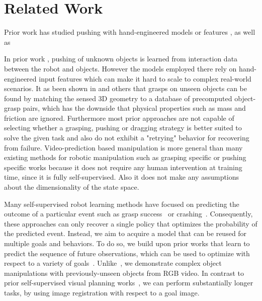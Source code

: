 \vspace{-0.1cm}
\section{Related Work}
\vspace{-0.1cm}

Prior work has studied pushing with hand-engineered models or features \cite{hermans2013learning,salganicoff1993vision}, as well as 

In prior work \cite{hermans2013learning,salganicoff1993vision}, pushing of unknown objects is learned from interaction data between the robot and objects. However the models employed there rely on hand-engineered input features which can make it hard to scale to complex real-world scenarios. 
It as been shown in \cite{goldfeder2009data} and others that grasps on unseen objects can be found by matching the sensed 3D geometry to a database of precomputed object-grasp pairs, which has the downside that physical properties such as mass and friction are ignored. Furthermore most prior approaches are not capable of selecting whether a grasping, pushing or dragging strategy is better suited to solve the given task and also do not exhibit a "retrying" behavior for recovering from failure.
Video-prediction based manipulation is more general than many existing methods for robotic manipulation such as grasping specific \cite{lenz2015deep, goldfeder2009data, zeng2017robotic} or pushing specific works \cite{hermans2013learning, salganicoff1993vision} because it does not require any human intervention at training time, since it is fully self-supervised. Also it does not make any assumptions about the dimensionality of the state space.

Many self-supervised robot learning methods have focused on predicting the outcome of a particular event such as grasp success~\cite{lerrel,google_handeye,princeton_pushgrasp} or crashing~\cite{crashing,greg_kahn_uncertainty}. Consequently, these approaches can only recover a single policy that optimizes the probability of the predicted event. Instead, we aim to acquire a model that can be reused for multiple goals and behaviors. To do so, we build upon prior works that learn to predict the sequence of future observations, which can be used to optimize with respect to a variety of goals~\cite{foresight,sna,se3_control}. Unlike~\cite{se3_control}, we demonstrate complex object manipulations with previously-unseen objects from RGB video. In contrast to prior self-supervised visual planning works~\cite{foresight,sna}, we can perform substantially longer tasks, by using image registration with respect to a goal image.

